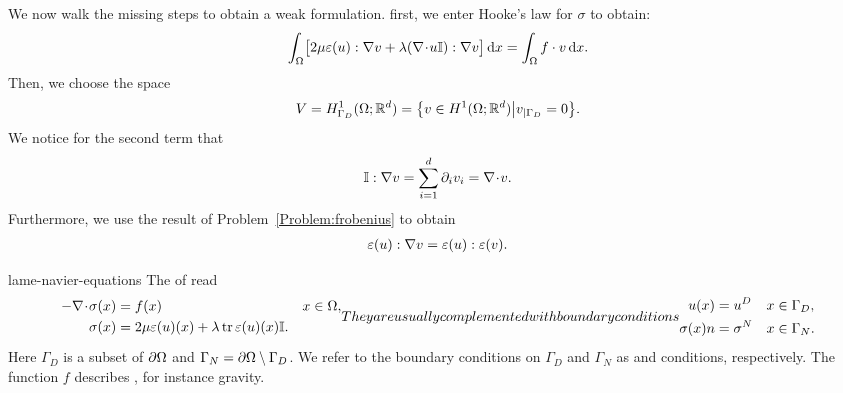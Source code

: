 \begin{intro}
  We now walk the missing steps to obtain a weak formulation. first,
  we enter Hooke's law for $\sigma$ to obtain:
  \begin{gather}
    \int_\Omega \bigl[2\mu \varepsilon(u) : \nabla v
    + \lambda (\nabla\!\cdot\! u \mathbb I) : \nabla v
    \bigr]\,\mathrm{d} x = \int_\Omega f\cdot v\,\mathrm{d} x.
  \end{gather}
  Then, we choose the space
  \begin{gather}
    V = H^1_{\Gamma_D}(\Omega; \mathbb R^d) = \bigl\{v\in H^1(\Omega;\mathbb R^d) \big\vert
    v_{|\Gamma_D} = 0 \bigr\}.
  \end{gather}
  We notice for the second term that
  \begin{gather}
    \mathbb I : \nabla v = \sum_{i=1}^d \partial_i v_i = \nabla\!\cdot\! v.
  \end{gather}
  Furthermore, we use the result of Problem~\ref{Problem:frobenius} to
  obtain
  \begin{gather}
    \varepsilon(u):\nabla v = \varepsilon(u) : \varepsilon(v).
  \end{gather}
\end{intro}

\begin{Definition}{lame-navier-equations}
  The  of  read
  \begin{subequations}
    \begin{gather}
      \begin{aligned}
        -\div \sigma(x) &= f(x) & x&\in\domain,\\
        \sigma(x) &= 2\mu \strain u(x) + \lambda \operatorname{tr} \strain u(x) \id.
      \end{aligned}
    \end{gather}
    They are usually complemented with boundary conditions
    \begin{gather}
      \begin{aligned}
        u(x) &= u^D & x&\in\Gamma_D, \\
        \sigma(x)n &=\sigma^N& x&\in\Gamma_N.
      \end{aligned}
    \end{gather}
  \end{subequations}
  Here $\Gamma_D$ is a subset of $\partial\Omega$ and
  $\Gamma_N = \partial\Omega\setminus\Gamma_D$.  We refer to the boundary
  conditions on $\Gamma_D$ and $\Gamma_N$ as 
  and  conditions, respectively.
  The function $f$ describes , for instance gravity.
\end{Definition}


